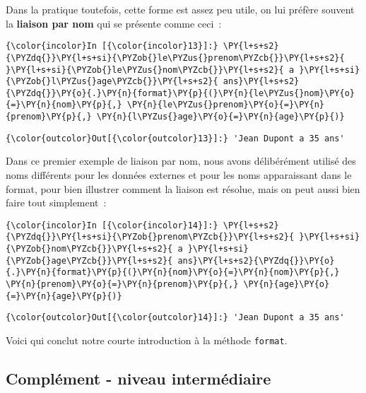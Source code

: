     Dans la pratique toutefois, cette forme est assez peu utile, on lui
préfère souvent la \textbf{liaison par nom} qui se présente comme ceci~:

    \begin{Verbatim}[commandchars=\\\{\}]
{\color{incolor}In [{\color{incolor}13}]:} \PY{l+s+s2}{\PYZdq{}}\PY{l+s+si}{\PYZob{}le\PYZus{}prenom\PYZcb{}}\PY{l+s+s2}{ }\PY{l+s+si}{\PYZob{}le\PYZus{}nom\PYZcb{}}\PY{l+s+s2}{ a }\PY{l+s+si}{\PYZob{}l\PYZus{}age\PYZcb{}}\PY{l+s+s2}{ ans}\PY{l+s+s2}{\PYZdq{}}\PY{o}{.}\PY{n}{format}\PY{p}{(}\PY{n}{le\PYZus{}nom}\PY{o}{=}\PY{n}{nom}\PY{p}{,} \PY{n}{le\PYZus{}prenom}\PY{o}{=}\PY{n}{prenom}\PY{p}{,} \PY{n}{l\PYZus{}age}\PY{o}{=}\PY{n}{age}\PY{p}{)}
\end{Verbatim}


\begin{Verbatim}[commandchars=\\\{\}]
{\color{outcolor}Out[{\color{outcolor}13}]:} 'Jean Dupont a 35 ans'
\end{Verbatim}
            
    Dans ce premier exemple de liaison par nom, nous avons délibérément
utilisé des noms différents pour les données externes et pour les noms
apparaissant dans le format, pour bien illustrer comment la liaison est
résolue, mais on peut aussi bien faire tout simplement~:

    \begin{Verbatim}[commandchars=\\\{\}]
{\color{incolor}In [{\color{incolor}14}]:} \PY{l+s+s2}{\PYZdq{}}\PY{l+s+si}{\PYZob{}prenom\PYZcb{}}\PY{l+s+s2}{ }\PY{l+s+si}{\PYZob{}nom\PYZcb{}}\PY{l+s+s2}{ a }\PY{l+s+si}{\PYZob{}age\PYZcb{}}\PY{l+s+s2}{ ans}\PY{l+s+s2}{\PYZdq{}}\PY{o}{.}\PY{n}{format}\PY{p}{(}\PY{n}{nom}\PY{o}{=}\PY{n}{nom}\PY{p}{,} \PY{n}{prenom}\PY{o}{=}\PY{n}{prenom}\PY{p}{,} \PY{n}{age}\PY{o}{=}\PY{n}{age}\PY{p}{)}
\end{Verbatim}


\begin{Verbatim}[commandchars=\\\{\}]
{\color{outcolor}Out[{\color{outcolor}14}]:} 'Jean Dupont a 35 ans'
\end{Verbatim}
            
    Voici qui conclut notre courte introduction à la méthode
\texttt{format}.

    \hypertarget{compluxe9ment---niveau-intermuxe9diaire}{%
\subsection{Complément - niveau
intermédiaire}\label{compluxe9ment---niveau-intermuxe9diaire}}

